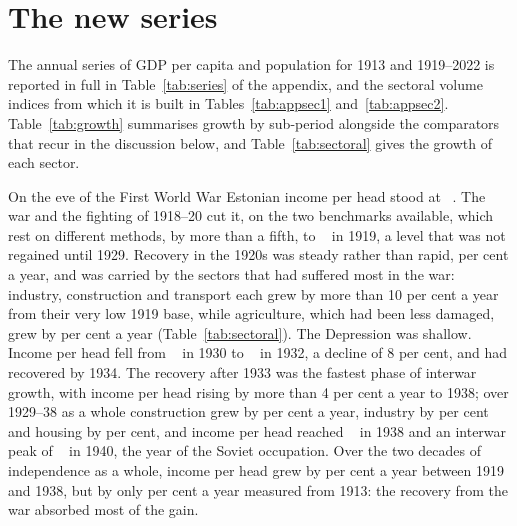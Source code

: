 \section{The new series}
\label{sec:results}

The annual series of GDP per capita and population for 1913 and 1919--2022 is reported in full in Table~\ref{tab:series} of the appendix, and the sectoral volume indices from which it is built in Tables~\ref{tab:appsec1} and~\ref{tab:appsec2}. Table~\ref{tab:growth} summarises growth by sub-period alongside the comparators that recur in the discussion below, and Table~\ref{tab:sectoral} gives the growth of each sector.





On the eve of the First World War Estonian income per head stood at ~\intlnineteen{}. The war and the fighting of 1918--20 cut it, on the two benchmarks available, which rest on different methods, by more than a fifth, to ~\intlnineteen{} in 1919, a level that was not regained until 1929. Recovery in the 1920s was steady rather than rapid,  per cent a year, and was carried by the sectors that had suffered most in the war: industry, construction and transport each grew by more than 10 per cent a year from their very low 1919 base, while agriculture, which had been less damaged, grew by  per cent a year (Table~\ref{tab:sectoral}). The Depression was shallow. Income per head fell from ~\intlnineteen{} in 1930 to ~\intlnineteen{} in 1932, a decline of 8 per cent, and had recovered by 1934. The recovery after 1933 was the fastest phase of interwar growth, with income per head rising by more than 4 per cent a year to 1938; over 1929--38 as a whole construction grew by  per cent a year, industry by  per cent and housing by  per cent, and income per head reached ~\intlnineteen{} in 1938 and an interwar peak of ~\intlnineteen{} in 1940, the year of the Soviet occupation. Over the two decades of independence as a whole, income per head grew by  per cent a year between 1919 and 1938, but by only  per cent a year measured from 1913: the recovery from the war absorbed most of the gain.

